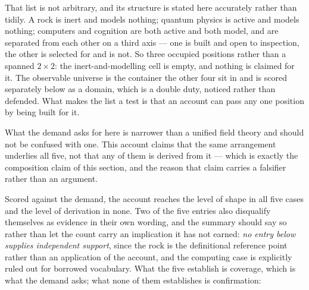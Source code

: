 \documentclass[11pt,a4paper]{article}
\begin{document}
That list is not arbitrary, and its structure is stated here accurately rather than tidily. A rock is inert and models nothing; quantum physics is active and models nothing; computers
and cognition are both active and both model, and are separated from each other on a third axis ---
one is built and open to inspection, the other is selected for and is not. So three occupied
positions rather than a spanned $2\times2$: the inert-and-modelling cell is empty, and nothing is
claimed for it. The observable universe is the container the other four sit in and is scored
separately below as a domain, which is a double duty, noticed rather than defended. What makes
the list a test is that an account can pass any one position by being built for it.

What the demand asks for here is narrower than a unified field theory and should not be confused with
one. This account claims that the same arrangement underlies all five, not that any of them is
derived from it --- which is exactly the composition claim of this section, and the reason that claim
carries a falsifier rather than an argument.

Scored against the demand, the account reaches the level of shape in all five cases and the level of
derivation in none. Two of the five entries also disqualify themselves as evidence in their own
wording, and the summary should say so rather than let the count carry an implication it has not
earned: \emph{no entry below supplies independent support}, since the rock is the definitional
reference point rather than an application of the account, and the computing case is explicitly
ruled out for borrowed vocabulary. What the five establish is coverage, which is what the demand
asks; what none of them establishes is confirmation:
\end{document}

